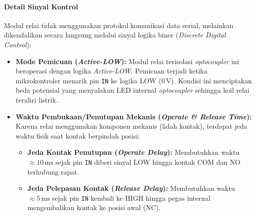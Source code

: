 \paragraph{Detail Sinyal Kontrol}
Modul relai tidak menggunakan protokol komunikasi data serial, melainkan dikendalikan secara langsung melalui sinyal logika biner (\textit{Discrete Digital Control}):
\begin{itemize}
	\item \textbf{Mode Pemicuan (\textit{Active-LOW}):} Modul relai terisolasi \textit{optocoupler} ini beroperasi dengan logika \textit{Active-LOW}. Pemicuan terjadi ketika mikrokontroler menarik pin \texttt{IN} ke logika LOW ($0\,\text{V}$). Kondisi ini menciptakan beda potensial yang menyalakan LED internal \textit{optocoupler} sehingga koil relai teraliri listrik.
	\item \textbf{Waktu Pembukaan/Penutupan Mekanis (\textit{Operate \& Release Time}):} Karena relai menggunakan komponen mekanis (lidah kontak), terdapat jeda waktu fisik saat kontak berpindah posisi:
	      \begin{itemize}
		      \item \textbf{Jeda Kontak Penutupan (\textit{Operate Delay}):} Membutuhkan waktu $\approx 10\,\text{ms}$ sejak pin \texttt{IN} diberi sinyal LOW hingga kontak COM dan NO terhubung rapat.
		      \item \textbf{Jeda Pelepasan Kontak (\textit{Release Delay}):} Membutuhkan waktu $\approx 5\,\text{ms}$ sejak pin \texttt{IN} kembali ke HIGH hingga pegas internal mengembalikan kontak ke posisi awal (NC).
	      \end{itemize}
\end{itemize}

